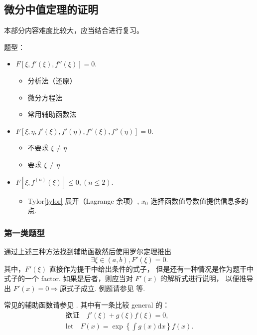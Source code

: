 \subsection{微分中值定理的证明}

本部分内容难度比较大，应当结合\cite{we}进行复习。

题型：
\begin{itemize}
    \item $F\left[\xi, f'(\xi), f''(\xi)\right] = 0$.
        \begin{itemize}
            \item 分析法（还原）
            \item 微分方程法
            \item 常用辅助函数法
        \end{itemize}
    \item $F\left[\xi, \eta, f'(\xi), f'(\eta), f''(\xi), f''(\eta)\right] = 0$.
        \begin{itemize}
            \item 不要求 $\xi \neq \eta$
            \item 要求 $\xi \neq \eta$
        \end{itemize}
    \item $F\left[\xi, f^{(n)}(\xi)\right] \leq 0, (n \leq 2)$.
        \begin{itemize}
            \item Tylor\ref{tylor} 展开（Lagrange 余项）, 
                  $x_0$ 选择函数值导数值提供信息多的点.
        \end{itemize}
\end{itemize}

\subsubsection{第一类题型}

通过上述三种方法找到辅助函数然后使用罗尔定理推出
\[
    \exists \xi \in \left(a, b\right), F'(\xi) = 0.
\]
其中，$F'(\xi)$ 直接作为提干中给出条件的式子，
但是还有一种情况是作为题干中式子的一个 factor.
如果是后者，则应当对 $F'(x)$ 的解析式进行说明，
以便推导出 $F'(x) = 0 \Rightarrow \mbox{原式子成立}$.
例题请参见 \cite[page 82, pdf 93, example 2]{we} 等.

常见的辅助函数请参见 \cite[page 83, pdf 94]{we}.
其中有一条比较 general 的：
\begin{align*}
    \mbox{欲证}\quad f'(\xi) + g(\xi) f(\xi) = 0,  \\
    \mbox{let} \quad 
    F(x) = \exp \left\{\int g(x) \mathrm{d}x\right\} f(x).
\end{align*}

